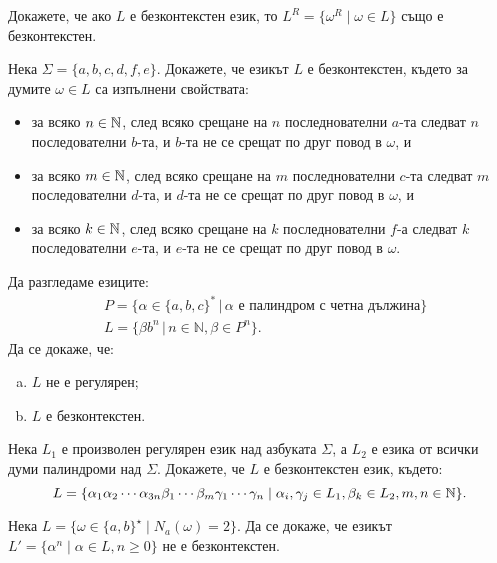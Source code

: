 \begin{problem}
  Докажете, че ако $L$ е безконтекстен език, то $L^R = \{\omega^R \mid \omega \in L\}$ 
  също е безконтекстен.
\end{problem}

\begin{problem}
  Нека $\Sigma = \{a,b,c,d,f,e\}$.
  Докажете, че езикът $L$ е безконтекстен, където за думите $\omega \in L$ са изпълнени свойствата:
  \begin{itemize}[-]
  \item 
    за всяко $n\in\mathbb{N}$, след всяко срещане на $n$ последнователни $a$-та
    следват $n$ последователни $b$-та, и $b$-та не се срещат по друг повод в $\omega$, и
  \item
    за всяко $m\in\mathbb{N}$, след всяко срещане на $m$ последнователни $c$-та
    следват $m$ последователни $d$-та, и $d$-та не се срещат по друг повод в $\omega$, и
  \item
    за всяко $k\in\mathbb{N}$, след всяко срещане на $k$ последнователни $f$-а
    следват $k$ последователни $e$-та, и $e$-та не се срещат по друг повод в $\omega$.
  \end{itemize}
\end{problem}

\begin{problem}
  Да разгледаме езиците:
  \begin{align*}
    & P = \{\alpha\in\{a,b,c\}^*\,|\, \alpha \text{ е палиндром с четна дължина}\} \\
    & L =  \{\beta b^n\,|\, n\in\mathbb{N}, \beta\in P^n\}.
  \end{align*}
  Да се докаже, че:
  \begin{enumerate}[a)]
  \item 
    $L$ не е регулярен;
  \item 
    $L$ е безконтекстен.
  \end{enumerate}
\end{problem}

\begin{problem}
  Нека $L_1$ е произволен регулярен език над азбуката $\Sigma$, 
  а $L_2$ е езика от всички думи палиндроми над $\Sigma$.
  Докажете, че $L$ е безконтекстен език, където:
  \[L = \{\alpha_1\alpha_2\cdots\alpha_{3n}\beta_1\cdots\beta_m\gamma_1\cdots\gamma_n \mid \alpha_i,\gamma_j \in L_1, \beta_k\in L_2, m,n \in \mathbb{N}\}.\]
\end{problem}

\begin{problem}
  Нека $L = \{\omega\in\{a,b\}^\star \mid N_a(\omega) = 2\}$.
  Да се докаже, че езикът $L' = \{\alpha^n \mid \alpha\in L, n \geq 0\}$ не е безконтекстен.
\end{problem}


